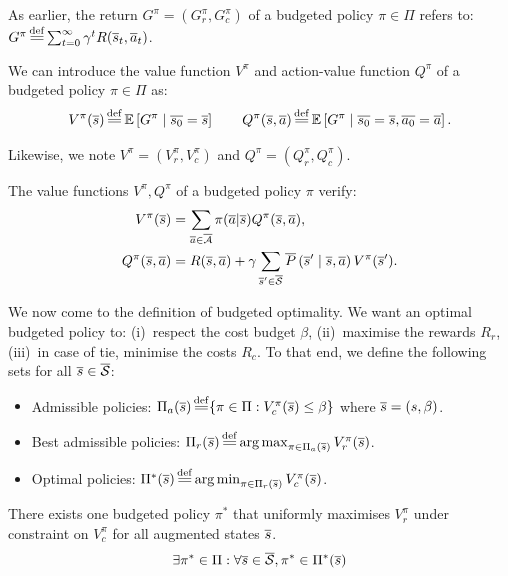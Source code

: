 \documentclass{article}
\begin{document}
As earlier, the return $G^\pi = (G_r^\pi, G_c^\pi)$ of a budgeted policy $\pi\in\Pi$ refers to:
    $G^\pi \eqdef \sum_{t=0}^\infty \gamma^t R(\os_t, \oa_t)$.

We can introduce the value function $V^\pi$ and action-value function $Q^\pi$ of a budgeted policy $\pi\in\Pi$ as:
\begin{equation}
    \label{eq:value-function}
V^\pi(\os) \eqdef \expectedvalue\left[ G^\pi \condbar \ov{s_0} = \os\right] \qquad Q^\pi(\os, \oa) \eqdef \expectedvalue\left[ G^\pi \condbar \ov{s_0} = \os, \ov{a_0} = \oa\right].
\end{equation}

Likewise, we note $V^\pi = (V_r^\pi, V_c^\pi)$ and $Q^\pi = (Q_r^\pi, Q_c^\pi)$.

\begin{proposition}
\label{prop:bellman-expectation}
The value functions $V^\pi, Q^\pi$ of a budgeted policy $\pi$ verify:
\begin{align}
    V^\pi(\overline{s}) &= \sum_{\overline{a}\in\overline{\mathcal{A}}}\pi(\overline{a} | \overline{s}) Q^\pi(\overline{s}, \overline{a}),\\
    Q^\pi(\overline{s}, \overline{a}) &= R(\overline{s}, \overline{a}) + \gamma\sum_{\overline{s}'\in\overline{\mathcal{S}}}\overline{P}\left(\overline{s}' \;\middle|\; \overline{s}, \overline{a}\right) V^\pi(\overline{s}') \label{eq:bellman_expectation_Q}.
\end{align}
\end{proposition}


\begin{definition}
We now come to the definition of budgeted optimality. We want an optimal budgeted policy to: (i)~respect the cost budget $\beta$, (ii)~maximise the rewards $R_r$, (iii)~in case of tie, minimise the costs $R_c$. To that end, we define the following sets for all $\overline{s}\in\overline{\mathcal{S}}$:
\begin{itemize}
    \item Admissible policies: $\Pi_a(\os) \eqdef \{\pi\in\Pi: V_c^\pi(\os) \leq \beta\}$ where $\overline{s} = (s, \beta)$.
    \item Best admissible policies: $\Pi_r(\os) \eqdef \argmax_{\pi\in\Pi_a(\os)}  V_r^\pi(\os)$.
    \item Optimal policies: $\Pi^*(\os) \eqdef \argmin_{\pi\in\Pi_r(\os)}  V_c^\pi(\os)$.
\end{itemize}
\end{definition}


\begin{assumption}
There exists one budgeted policy $\pi^*$ that uniformly maximises $V_r^\pi$ under constraint on $V_c^\pi$ for all augmented states $\overline{s}$.
\begin{align*}
    \exists \pi^*\in\Pi: \forall \overline{s}\in \overline{\mathcal{S}}, \pi^*\in\Pi^*(\overline{s})
\end{align*}
\end{assumption}
\end{document}
